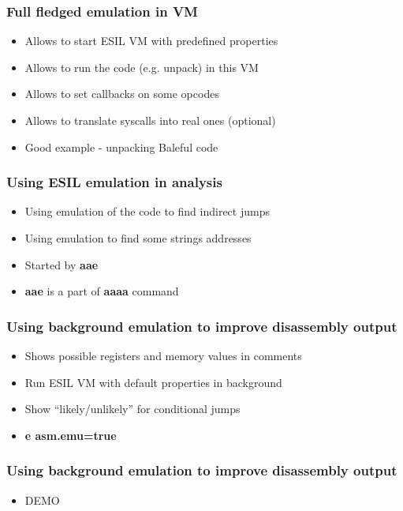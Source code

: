 \documentclass[10pt,pdf,utf8,english,compress,hyperref={unicode}]{beamer}
\begin{document}
\begin{frame}[fragile]
  \frametitle{Full fledged emulation in VM}
     \begin{itemize}
        \item Allows to start ESIL VM with predefined properties
		\item Allows to run the code (e.g. unpack) in this VM
		\item Allows to set callbacks on some opcodes
		\item Allows to translate syscalls into real ones (optional)
		\item Good example - unpacking Baleful code 
      \end{itemize}
\end{frame}

\begin{frame}[fragile]
  \frametitle{Using ESIL emulation in analysis}
     \begin{itemize}
        \item Using emulation of the code to find indirect jumps
		\item Using emulation to find some strings addresses
		\item Started by \alert{\bf{aae}}
		\item \alert{\bf{aae}} is a part of \alert{\bf{aaaa}} command
      \end{itemize}
\end{frame}

\begin{frame}[fragile]
  \frametitle{Using background emulation to improve disassembly output}
     \begin{itemize}
        \item Shows possible registers and memory values in comments
		\item Run ESIL VM with default properties in background
		\item Show ``likely/unlikely'' for conditional jumps
		\item \alert{\bf{e asm.emu=true}}
      \end{itemize}
\end{frame}

\begin{frame}[fragile]
  \frametitle{Using background emulation to improve disassembly output}
     \begin{itemize}
        \item DEMO
      \end{itemize}
\end{frame}
\end{document}
